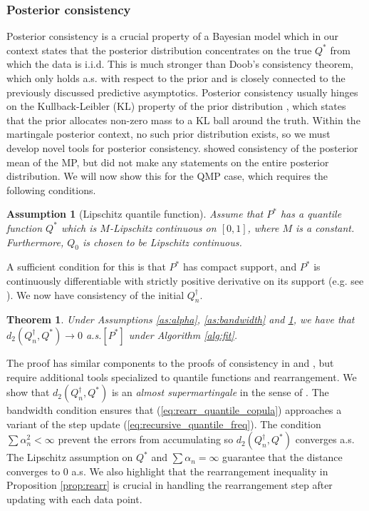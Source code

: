 \documentclass[11pt,a4paper]{article}
\newtheorem{theorem}{Theorem}%
\newtheorem{assumption}{Assumption}%
\newenvironment{proof_outline}{\begin{proof}[Proof outline]}{\end{proof}}
\begin{document}
\subsubsection{Posterior consistency}\label{sec:consistency}
Posterior consistency is a crucial property of a Bayesian model which in our context states that the posterior distribution concentrates on the true $Q^*$ from which the data is i.i.d. This is much stronger than Doob's consistency theorem, which only holds a.s. with respect to the prior and is closely connected to the previously discussed predictive asymptotics. Posterior consistency usually hinges on the Kullback-Leibler (KL) property of the prior distribution \citep[Chapter 6]{Ghosal2017}, which states that the prior allocates non-zero mass to a KL ball around the truth. Within the martingale posterior context, no such prior distribution exists, so we must develop novel tools for posterior consistency. \cite{Fong2023a} showed consistency of the posterior mean of the MP, but did not make any statements on the entire posterior distribution. We will now show this for the QMP case, which requires the following conditions.
\begin{assumption}[Lipschitz quantile function]\label{as:consistency_truth}
Assume that $P^*$ has a quantile function $Q^*$ which is $M$-Lipschitz continuous on $[0,1]$, where $M$ is a constant. Furthermore, $Q_0$ is chosen to be Lipschitz continuous. 
\end{assumption}
A sufficient condition for this is that $P^*$ has compact support, and $P^*$ is continuously differentiable with strictly positive derivative on its support (e.g. see \cite[Lemma 21.4]{vanderVaart2000}). We now have consistency of the initial $Q_n^{\dagger}$.
\begin{theorem}\label{th:consistency_mean}
    Under {Assumptions \ref{as:alpha}},  {\ref{as:bandwidth}} and  {\ref{as:consistency_truth}}, we have that $d_2( Q_n^{\dagger},Q^*) \to 0$ a.s.$[P^*]$ under {Algorithm \ref{alg:fit}}.
\end{theorem}
\begin{proof_outline}
    The proof has similar components to the proofs of consistency in \cite{Hahn2018} and \cite{Fong2023a}, but require additional tools specialized to quantile functions and rearrangement. We show that $d_2( Q_n^{\dagger},Q^*)$ is an \textit{almost supermartingale} in the sense of \cite{Robbins1971}. The bandwidth condition ensures that (\ref{eq:rearr_quantile_copula}) approaches a variant of the step update (\ref{eq:recursive_quantile_freq}). The condition $\sum \alpha_n^2 < \infty$ prevent the errors from  accumulating so $d_2(Q_n^{\dagger},Q^*)$ converges a.s. 
 The Lipschitz assumption on $Q^*$ and $\sum \alpha_n =  \infty$ guarantee that the distance converges to 0 a.s.  We also highlight that the rearrangement inequality in {Proposition \ref{prop:rearr}} is crucial in handling the rearrangement step after updating with each data point.  
\end{proof_outline}
\end{document}
